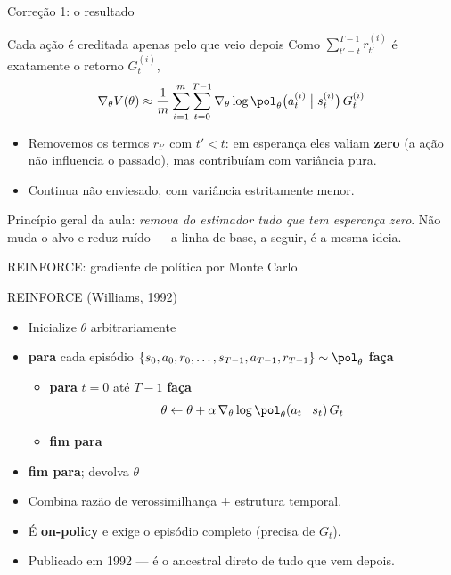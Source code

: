 \documentclass[aspectratio=169, 11pt]{beamer}
\newcommand{\thv}{\theta}                       %
\newcommand{\polth}{\pol_{\thv}}                %
\newcommand{\gth}{\nabla_{\thv}}                %
\begin{document}
\begin{frame}{Correção 1: o resultado}

  \begin{teobox}{Cada ação é creditada apenas pelo que veio depois}
    Como $\sum_{t'=t}^{T-1} r^{(i)}_{t'}$ é exatamente o retorno $G^{(i)}_t$,
    \[
      \gth V(\thv) \approx \frac{1}{m}\sum_{i=1}^{m}\sum_{t=0}^{T-1}
        \gth \log \polth\bigl(a^{(i)}_t\bigm| s^{(i)}_t\bigr)\, G^{(i)}_t
    \]
  \end{teobox}

  \begin{itemize}\setlength{\itemsep}{0.4ex}
    \item Removemos os termos $r_{t'}$ com $t' < t$: em esperança eles valiam
      \textbf{zero} (a ação não influencia o passado), mas contribuíam com
      variância pura.
    \item Continua não enviesado, com variância estritamente menor.
  \end{itemize}

  \begin{ideiabox}
    Princípio geral da aula: \emph{remova do estimador tudo que tem esperança
    zero}. Não muda o alvo e reduz ruído --- a linha de base, a seguir, é a
    mesma ideia.
  \end{ideiabox}
\end{frame}

\begin{frame}{REINFORCE: gradiente de política por Monte Carlo}

  \begin{algbox}{REINFORCE \textnormal{(Williams, 1992)}}
    {\small
    \begin{itemize}\setlength{\itemsep}{0.15ex}
      \item Inicialize $\thv$ arbitrariamente
      \item \textbf{para} cada episódio
        $\{s_0,a_0,r_0,\dots,s_{T-1},a_{T-1},r_{T-1}\} \sim \polth$ \textbf{faça}
        \begin{itemize}\setlength{\itemsep}{0.1ex}
          \item \textbf{para} $t = 0$ até $T-1$ \textbf{faça}
            \[ \thv \leftarrow \thv + \alpha\, \gth \log \polth(a_t\mid s_t)\, G_t \]
          \item \textbf{fim para}
        \end{itemize}
      \item \textbf{fim para}; devolva $\thv$
    \end{itemize}}
  \end{algbox}

  \begin{itemize}\setlength{\itemsep}{0.3ex}
    \item Combina razão de verossimilhança $+$ estrutura temporal.
    \item É \textbf{on-policy} e exige o episódio completo (precisa de $G_t$).
    \item Publicado em 1992 --- é o ancestral direto de tudo que vem depois.
  \end{itemize}
\end{frame}
\end{document}
